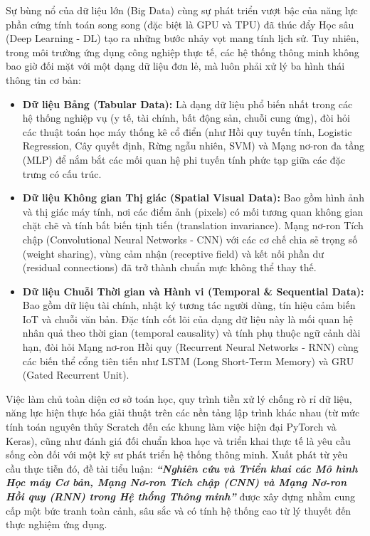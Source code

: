 \documentclass[12pt,a4paper]{report}
\begin{document}
Sự bùng nổ của dữ liệu lớn (Big Data) cùng sự phát triển vượt bậc của năng lực phần cứng tính toán song song (đặc biệt là GPU và TPU) đã thúc đẩy Học sâu (Deep Learning - DL) tạo ra những bước nhảy vọt mang tính lịch sử. Tuy nhiên, trong môi trường ứng dụng công nghiệp thực tế, các hệ thống thông minh không bao giờ đối mặt với một dạng dữ liệu đơn lẻ, mà luôn phải xử lý ba hình thái thông tin cơ bản:
\begin{itemize}[leftmargin=1.2cm]
    \item \textbf{Dữ liệu Bảng (Tabular Data):} Là dạng dữ liệu phổ biến nhất trong các hệ thống nghiệp vụ (y tế, tài chính, bất động sản, chuỗi cung ứng), đòi hỏi các thuật toán học máy thống kê cổ điển (như Hồi quy tuyến tính, Logistic Regression, Cây quyết định, Rừng ngẫu nhiên, SVM) và Mạng nơ-ron đa tầng (MLP) để nắm bắt các mối quan hệ phi tuyến tính phức tạp giữa các đặc trưng có cấu trúc.
    \item \textbf{Dữ liệu Không gian Thị giác (Spatial Visual Data):} Bao gồm hình ảnh và thị giác máy tính, nơi các điểm ảnh (pixels) có mối tương quan không gian chặt chẽ và tính bất biến tịnh tiến (translation invariance). Mạng nơ-ron Tích chập (Convolutional Neural Networks - CNN) với các cơ chế chia sẻ trọng số (weight sharing), vùng cảm nhận (receptive field) và kết nối phần dư (residual connections) đã trở thành chuẩn mực không thể thay thế.
    \item \textbf{Dữ liệu Chuỗi Thời gian và Hành vi (Temporal \& Sequential Data):} Bao gồm dữ liệu tài chính, nhật ký tương tác người dùng, tín hiệu cảm biến IoT và chuỗi văn bản. Đặc tính cốt lõi của dạng dữ liệu này là mối quan hệ nhân quả theo thời gian (temporal causality) và tính phụ thuộc ngữ cảnh dài hạn, đòi hỏi Mạng nơ-ron Hồi quy (Recurrent Neural Networks - RNN) cùng các biến thể cổng tiên tiến như LSTM (Long Short-Term Memory) và GRU (Gated Recurrent Unit).
\end{itemize}

Việc làm chủ toàn diện cơ sở toán học, quy trình tiền xử lý chống rò rỉ dữ liệu, năng lực hiện thực hóa giải thuật trên các nền tảng lập trình khác nhau (từ mức tính toán nguyên thủy Scratch đến các khung làm việc hiện đại PyTorch và Keras), cũng như đánh giá đối chuẩn khoa học và triển khai thực tế là yêu cầu sống còn đối với một kỹ sư phát triển hệ thống thông minh. Xuất phát từ yêu cầu thực tiễn đó, đề tài tiểu luận: \textbf{\textit{“Nghiên cứu và Triển khai các Mô hình Học máy Cơ bản, Mạng Nơ-ron Tích chập (CNN) và Mạng Nơ-ron Hồi quy (RNN) trong Hệ thống Thông minh”}} được xây dựng nhằm cung cấp một bức tranh toàn cảnh, sâu sắc và có tính hệ thống cao từ lý thuyết đến thực nghiệm ứng dụng.
\end{document}
